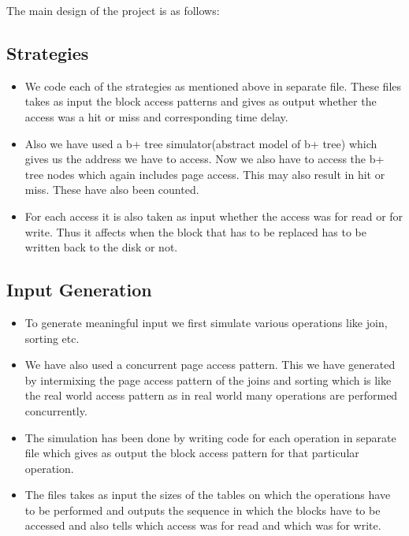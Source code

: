 The main design of the project is as follows:

\subsection*{{Strategies}}
\begin{itemize}
\item We code each of the strategies as mentioned above in separate file. These files takes as input the block access patterns and gives as output whether the access was a hit or miss and corresponding time delay. 

\item Also we have used a b+ tree simulator(abstract model of b+ tree) which gives us the address we have to access. Now we also have to access the b+ tree nodes which again includes page access. This may also result in hit or miss. These have also been counted.

\item For each access it is also taken as input whether the access was for read or for write. Thus it affects when the block that has to be replaced has to be written back to the disk or not.
\end{itemize}

\subsection*{{Input Generation}}
\begin{itemize}
\item To generate meaningful input we first simulate various operations like join, sorting etc. 
\item We have also used a concurrent page access pattern. This we have generated by intermixing the page access pattern of the joins and sorting which is like the real world access pattern as in real world many operations are performed concurrently.
\item The simulation has been done by writing code for each operation in separate file which gives as output the block access pattern for that particular operation.
\item The files takes as input the sizes of the tables on which the operations have to be performed and outputs the sequence in which the blocks have to be accessed and also tells which access was for read and which was for write.
\end{itemize}

